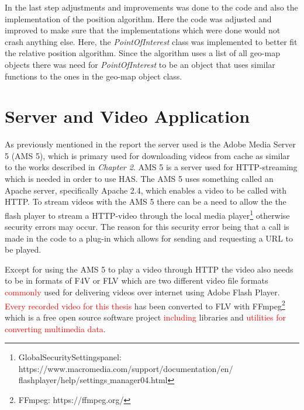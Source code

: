 In the last step adjustments and improvements was done to the code and also the implementation of the position algorithm. Here the code was adjusted and improved to make sure that the implementations which were done would not crash anything else. Here, the \textit{PointOfInterest} class was implemented to better fit the relative position algorithm. Since the algorithm uses a list of all geo-map objects there was need for \textit{PointOfInterest} to be an object that uses similar functions to the ones in the geo-map object class. 

\section{Server and Video Application}
\label{sec:server}

As previously mentioned in the report the server used is the Adobe Media Server 5 (AMS 5), which is primary used for downloading videos from cache as similar to the works described in \textit{Chapter 2}. AMS 5 is a server used for HTTP-streaming which is needed in order to use HAS. The AMS 5 uses something called an Apache server, specifically Apache 2.4, which enables a video to be called with HTTP. To stream videos with the AMS 5 there can be a need to allow the the flash player to stream a HTTP-video through the local media player\footnote{Global\:Security\:Settings\:panel: https://www.macromedia.com/support/documentation/en/\\flashplayer/help/settings$\_$manager04.html} otherwise security errors may occur. The reason for this security error being that a call is made in the code to a plug-in which allows for sending and requesting a URL to be played.

Except for using the AMS 5 to play a video through HTTP the video also needs to be in formats of F4V or FLV which are two different video file formats \textcolor{red}{commonly} used for delivering videos over internet using Adobe Flash Player. \textcolor{red}{Every recorded video for this thesis} has been converted to FLV with FFmpeg\footnote{FFmpeg: https://ffmpeg.org/} which is a free open source software project \textcolor{red}{including} libraries and \textcolor{red}{utilities for converting multimedia data}.


